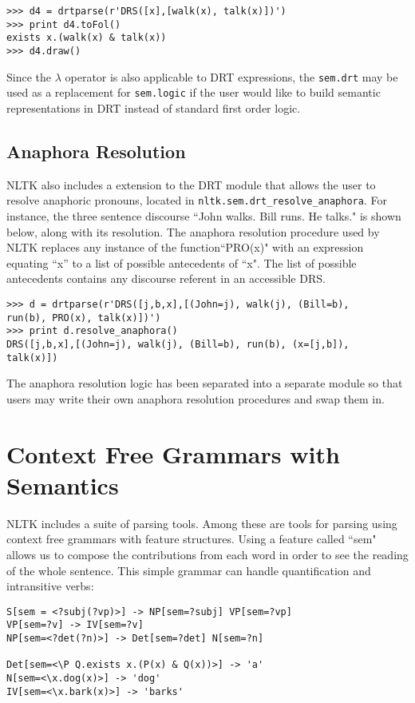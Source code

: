 \documentclass[11pt]{article}
\newcommand{\dhgcode}[1]{{\tt #1}}
\begin{document}
\begin{verbatim}
>>> d4 = drtparse(r'DRS([x],[walk(x), talk(x)])')
>>> print d4.toFol()
exists x.(walk(x) & talk(x))
>>> d4.draw()
\end{verbatim}

Since the $\lambda$ operator is also applicable to DRT expressions, the \dhgcode{sem.drt} may be used as a replacement for \dhgcode{sem.logic} if the user would like to build semantic representations in DRT instead of standard first order logic.


\subsection{Anaphora Resolution}
NLTK also includes a extension to the DRT module that allows the user to resolve anaphoric pronouns, located in \dhgcode{nltk.sem.drt\_resolve\_anaphora}.  For instance, the three sentence discourse ``John walks.  Bill runs.  He talks." is shown below, along with its resolution.  The anaphora resolution procedure used by NLTK replaces any instance of the function``PRO(x)" with an expression equating ``x'' to a list of possible antecedents of ``x".  The list of possible antecedents contains any discourse referent in an accessible DRS.

\begin{verbatim}
>>> d = drtparse(r'DRS([j,b,x],[(John=j), walk(j), (Bill=b), 
run(b), PRO(x), talk(x)])')
>>> print d.resolve_anaphora()
DRS([j,b,x],[(John=j), walk(j), (Bill=b), run(b), (x=[j,b]), 
talk(x)])
\end{verbatim}

The anaphora resolution logic has been separated into a separate module so that users may write their own anaphora resolution procedures and swap them in.


\section{Context Free Grammars with Semantics}
NLTK includes a suite of parsing tools.  Among these are tools for parsing using context free grammars with feature structures.  Using a feature called ``sem" allows us to compose the contributions from each word in order to see the reading of the whole sentence.  This simple grammar can handle quantification and intransitive verbs:

\begin{verbatim}
S[sem = <?subj(?vp)>] -> NP[sem=?subj] VP[sem=?vp]
VP[sem=?v] -> IV[sem=?v]
NP[sem=<?det(?n)>] -> Det[sem=?det] N[sem=?n]

Det[sem=<\P Q.exists x.(P(x) & Q(x))>] -> 'a'
N[sem=<\x.dog(x)>] -> 'dog'
IV[sem=<\x.bark(x)>] -> 'barks'
\end{verbatim}
\end{document}
